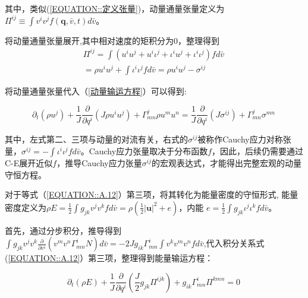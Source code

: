 \documentclass[LBMDerivation.tex]{subfiles}
\begin{document}
其中，类似(\ref{EQUATION::定义张量})，动量通量张量定义为$\Pi^{ij} \equiv \int  v^{i} v^{j} f(\boldsymbol{q}, \bar{v}, t)d \bar{v}$。

将动量通量张量展开,其中相对速度的矩积分为0，整理得到
\begin{equation}
  \begin{aligned}
    \Pi^{i j}=\int   \left(u^{i} u^{j}+u^{i} \iota^{j}+\iota^{i} u^{j}+\iota^{i} \iota^{j}\right) f  d \bar{v} \\
    =\rho u^{i} u^{j}+\int \iota^{i} \iota^{j} f  d \bar{v} = \rho u^{i} u^{j} -\sigma^{i j}
  \end{aligned}
  \label{EQUATION::动量通量推导} ~
\end{equation}

将动量通量张量代入（\ref{动量输运方程}）可以得到:

\begin{equation}
  \boxed{
    \partial_{t}\left(\rho u^{j}\right)+\frac{1}{J} \frac{\partial}{\partial q^{i}}\left(J \rho u^{i} u^{j} \right)+\Gamma_{mn}^{j} \rho u^{m} u^{n} = \frac{1}{J} \frac{\partial}{\partial q^{i}}\left(J \sigma^{ij} \right) + \Gamma_{mn}^{j} \sigma^{mn}
  }
  \label{动量方程输运形式} ~
\end{equation}
%



其中，左式第二、三项与动量的对流有关，右式的$\sigma^{i j}$被称作Cauchy应力对称张量，$\sigma^{i j}=-\int \iota^{i} \iota^{j} f  d \bar{v}$。Cauchy应力张量取决于分布函数$f$，因此，后续仍需要通过C-E展开近似$f$，推导Cauchy应力张量$\sigma^{i j}$的宏观表达式，才能得出完整宏观的动量守恒方程。
%
%

对于等式（\ref{EQUATION::A.12}）第三项，将其转化为能量密度的守恒形式, 能量密度定义为$\rho E= \frac{1}{2}\int g_{jk} v^{j}v^{k} f d\bar{v} =\rho (\frac{1}{2}|\boldsymbol{u}|^2+e)$，内能 $e=\frac{1}{2}\int g_{jk} \iota^{j} \iota^{k} f  d \bar{v}$。

首先，通过分步积分，推导得到$\int g_{jk} v^{j}v^{k}  \frac{\partial}{\partial v^{i}}\left( v^{m} v^{n} \Gamma_{mn}^{i} N\right)d \bar{v}=-2Jg_{ik} \Gamma_{mn}^i \int  v^k v^mv^n  f d \bar{v}$,代入积分关系式(\ref{EQUATION::A.12}）第三项，整理得到能量输运方程：

\begin{equation}
  \boxed{
  \partial_{t}\left(\rho E\right)  + \frac{1}{J} \frac{\partial}{\partial q^{i}}\left( \frac{J}{2} g_{jk}\Pi^{i j k} \right) + g_{ik} \Gamma^i_{mn} \Pi^{kmn}=0
  }
  \label{能量输运1} ~
\end{equation}
%
\end{document}
